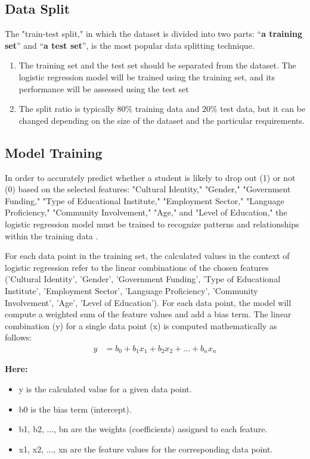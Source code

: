 \documentclass[a4paper,twoside]{article}
\begin{document}
\subsection{Data Split}
The "train-test split," in which the dataset is divided into two parts: “\textbf{a training set}” and  “\textbf{a test set}”, is the most popular data splitting technique.
\begin{enumerate}
  \item The training set and the test set should be separated from the dataset. The logistic regression model will be trained using the training set, and its performance will be assessed using the test set
  \item The split ratio is typically 80\% training data and 20\% test data, but it can be changed depending on the size of the dataset and the particular requirements.
\end{enumerate}

\subsection{Model Training}

In order to accurately predict whether a student is likely to drop out (1) or not (0) based on the selected features: "Cultural Identity," "Gender," "Government Funding," "Type of Educational Institute," "Employment Sector," "Language Proficiency," "Community Involvement," "Age," and "Level of Education," the logistic regression model must be trained to recognize patterns and relationships within the training data \cite{Parker13}.

For each data point in the training set, the calculated values in the context of logistic regression refer to the linear combinations of the chosen features ('Cultural Identity', 'Gender', 'Government Funding', 'Type of Educational Institute', 'Employment Sector', 'Language Proficiency', 'Community Involvement', 'Age', 'Level of Education'). For each data point, the model will compute a weighted sum of the feature values and add a bias term. The linear combination (y) for a single data point (x) is computed mathematically as follows:
\begin{align}
y &= b_0 + b_1 x_1 + b_2 x_2 + \ldots + b_n x_n
\end{align}

\textbf{Here:}
\begin{itemize}
  \item y is the calculated value for a given data point.
  \item b0 is the bias term (intercept).
  \item b1, b2, ..., bn are the weights (coefficients) assigned to each feature.
  \item x1, x2, ..., xn are the feature values for the corresponding data point.
\end{itemize}
\end{document}
